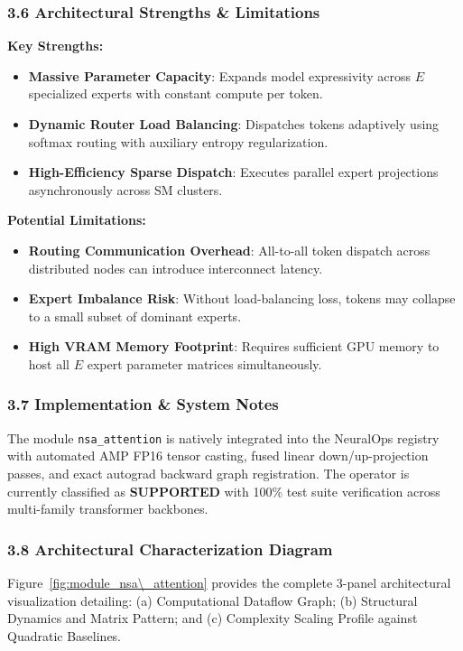 \subsubsection*{3.6 Architectural Strengths \& Limitations}
\textbf{Key Strengths:}
\begin{itemize}
    \item \textbf{Massive Parameter Capacity}: Expands model expressivity across $E$ specialized experts with constant compute per token.
    \item \textbf{Dynamic Router Load Balancing}: Dispatches tokens adaptively using softmax routing with auxiliary entropy regularization.
    \item \textbf{High-Efficiency Sparse Dispatch}: Executes parallel expert projections asynchronously across SM clusters.
\end{itemize}

\textbf{Potential Limitations:}
\begin{itemize}
    \item \textbf{Routing Communication Overhead}: All-to-all token dispatch across distributed nodes can introduce interconnect latency.
    \item \textbf{Expert Imbalance Risk}: Without load-balancing loss, tokens may collapse to a small subset of dominant experts.
    \item \textbf{High VRAM Memory Footprint}: Requires sufficient GPU memory to host all $E$ expert parameter matrices simultaneously.
\end{itemize}

\subsubsection*{3.7 Implementation \& System Notes}
The module \texttt{nsa\_attention} is natively integrated into the NeuralOps registry with automated AMP FP16 tensor casting, fused linear down/up-projection passes, and exact autograd backward graph registration. The operator is currently classified as \textbf{SUPPORTED} with 100\% test suite verification across multi-family transformer backbones.

\subsubsection*{3.8 Architectural Characterization Diagram}
Figure~\ref{fig:module_nsa\_attention} provides the complete 3-panel architectural visualization detailing: (a) Computational Dataflow Graph; (b) Structural Dynamics and Matrix Pattern; and (c) Complexity Scaling Profile against Quadratic Baselines.


